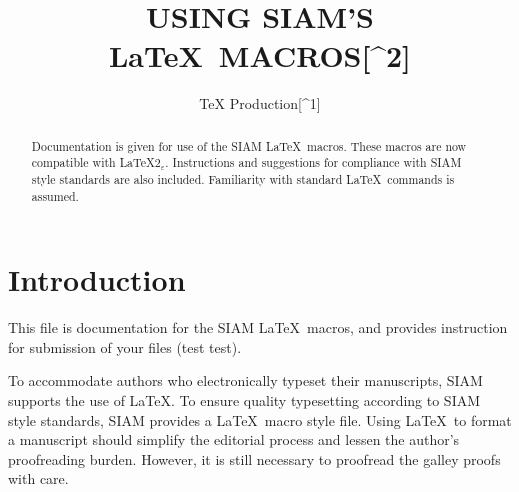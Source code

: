 \documentclass[]{siamltex}
\title{USING SIAM'S LaTeX~MACROS{[}\^{}2{]}}
\author{TeX Production{[}\^{}1{]}}
\date{}
\begin{document}
\maketitle
\begin{abstract}
Documentation is given for use of the SIAM LaTeX~macros. These macros
are now compatible with LaTeX\(2_{\varepsilon}\). Instructions and
suggestions for compliance with SIAM style standards are also included.
Familiarity with standard LaTeX~commands is assumed.
\end{abstract}

\section{Introduction}\label{introduction}

This file is documentation for the SIAM LaTeX~macros, and provides
instruction for submission of your files (test test).

To accommodate authors who electronically typeset their manuscripts,
SIAM supports the use of LaTeX. To ensure quality typesetting according
to SIAM style standards, SIAM provides a LaTeX~macro style file. Using
LaTeX~to format a manuscript should simplify the editorial process and
lessen the author's proofreading burden. However, it is still necessary
to proofread the galley proofs with care.
\end{document}
